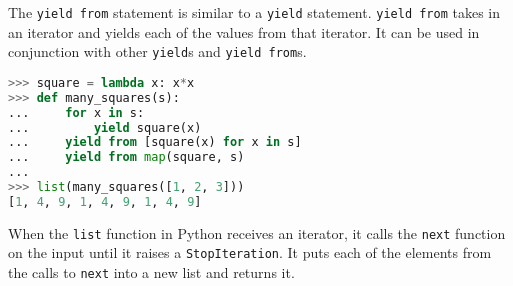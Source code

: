 The \texttt{yield from} statement is similar to a \texttt{yield} statement.
\texttt{yield from} takes in an iterator and yields each of the values from
that iterator. It can be used in conjunction with other \texttt{yield}s and
\texttt{yield from}s.

\vspace{1em}
\begin{lstlisting}[language=Python]
>>> square = lambda x: x*x
>>> def many_squares(s):
...     for x in s:
...         yield square(x)
...     yield from [square(x) for x in s]
...     yield from map(square, s)
...
>>> list(many_squares([1, 2, 3]))
[1, 4, 9, 1, 4, 9, 1, 4, 9]
\end{lstlisting}

When the \texttt{list} function in Python receives an iterator, it calls the
\texttt{next} function on the input until it raises a \texttt{StopIteration}. It
puts each of the elements from the calls to \texttt{next} into a new list and
returns it.
